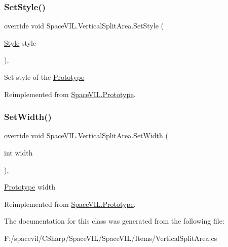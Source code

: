 \mbox{\label{class_space_v_i_l_1_1_vertical_split_area_a5911fe0a1fb51f9e14a4f3f31dac4ecd}} 
\subsubsection{\texorpdfstring{Set\+Style()}{SetStyle()}}
{\footnotesize\ttfamily override void Space\+V\+I\+L.\+Vertical\+Split\+Area.\+Set\+Style (\begin{DoxyParamCaption}\item[{\mbox{\hyperlink{class_space_v_i_l_1_1_decorations_1_1_style}{Style}}}]{style }\end{DoxyParamCaption})\hspace{0.3cm}{\ttfamily [inline]}, {\ttfamily [virtual]}}



Set style of the \mbox{\hyperlink{class_space_v_i_l_1_1_prototype}{Prototype}} 



Reimplemented from \mbox{\hyperlink{class_space_v_i_l_1_1_prototype_ae96644a6ace490afb376fb542161e541}{Space\+V\+I\+L.\+Prototype}}.

\mbox{\label{class_space_v_i_l_1_1_vertical_split_area_a665c01c8beced7686b57b7f4d41f3b70}} 
\subsubsection{\texorpdfstring{Set\+Width()}{SetWidth()}}
{\footnotesize\ttfamily override void Space\+V\+I\+L.\+Vertical\+Split\+Area.\+Set\+Width (\begin{DoxyParamCaption}\item[{int}]{width }\end{DoxyParamCaption})\hspace{0.3cm}{\ttfamily [inline]}, {\ttfamily [virtual]}}



\mbox{\hyperlink{class_space_v_i_l_1_1_prototype}{Prototype}} width 



Reimplemented from \mbox{\hyperlink{class_space_v_i_l_1_1_prototype_a6a4f1b9581f4d18f1c3a3e287d4b2a2b}{Space\+V\+I\+L.\+Prototype}}.



The documentation for this class was generated from the following file\+:\begin{DoxyCompactItemize}
\item 
F\+:/spacevil/\+C\+Sharp/\+Space\+V\+I\+L/\+Space\+V\+I\+L/\+Items/Vertical\+Split\+Area.\+cs\end{DoxyCompactItemize}
